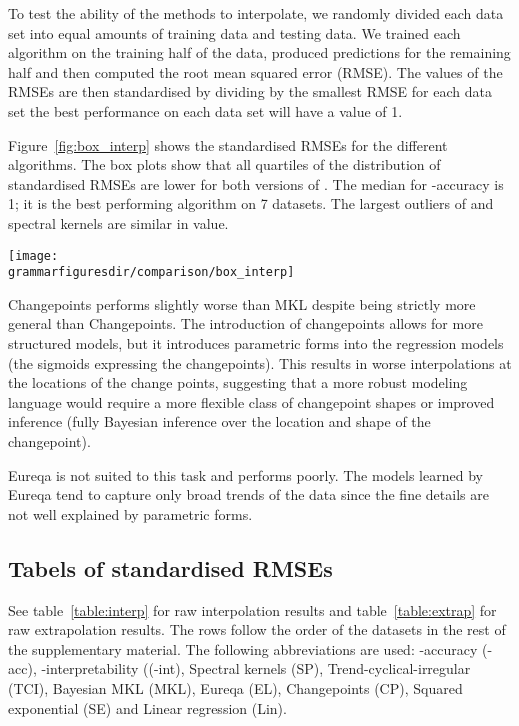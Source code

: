To test the ability of the methods to interpolate, we randomly divided each data set into equal amounts of training data and testing data.
We trained each algorithm on the training half of the data, produced predictions for the remaining half and then computed the root mean squared error (RMSE).
The values of the RMSEs are then standardised by dividing by the smallest RMSE for each data set \ie the best performance on each data set will have a value of 1.

Figure~\ref{fig:box_interp} shows the standardised RMSEs for the different algorithms.
The box plots show that all quartiles of the distribution of standardised RMSEs are lower for both versions of \procedurename{}.
The median for \procedurename{}-accuracy is 1; it is the best performing algorithm on 7 datasets.
The largest outliers of \procedurename{} and spectral kernels are similar in value.

\begin{figure*}[ht]
\centering
\texttt{[image: \\grammarfiguresdir/comparison/box\_interp]}
\caption[Comparision of extrapolation error of all methods on 13 time-series datasets.]
{Box plot of standardised RMSE (best performance = 1) on 13 interpolation tasks.}
\label{fig:box_interp}
\end{figure*}

Changepoints performs slightly worse than MKL despite being strictly more general than Changepoints.
The introduction of changepoints allows for more structured models, but it introduces parametric forms into the regression models (\ie the sigmoids expressing the changepoints).
This results in worse interpolations at the locations of the change points, suggesting that a more robust modeling language would require a more flexible class of changepoint shapes or improved inference (\eg fully Bayesian inference over the location and shape of the changepoint).

Eureqa is not suited to this task and performs poorly.
The models learned by Eureqa tend to capture only broad trends of the data since the fine details are not well explained by parametric forms.

\subsection{Tabels of standardised RMSEs}

See table~\ref{table:interp} for raw interpolation results and table~\ref{table:extrap} for raw extrapolation results. 
The rows follow the order of the datasets in the rest of the supplementary material.
The following abbreviations are used: \procedurename{}-accuracy (\procedurename{}-acc), \procedurename{}-interpretability ((\procedurename{}-int), Spectral kernels (SP), Trend-cyclical-irregular (TCI), Bayesian MKL (MKL), Eureqa (EL), Changepoints (CP), Squared exponential (SE) and Linear regression (Lin).

